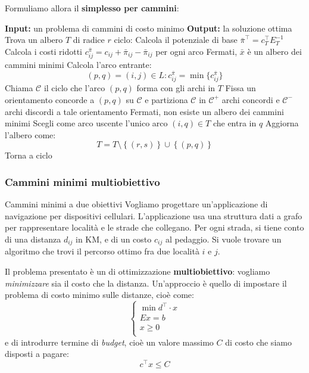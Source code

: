 \documentclass[a4paper,11pt]{article}
\begin{document}
Formuliamo allora il \textbf{simplesso per cammini}:
\begin{algorithm}[H]
\caption{del simplesso per cammini}
\begin{algorithmic}
	\STATE \textbf{Input:} un problema di cammini di costo minimo 
	\STATE \textbf{Output:} la soluzione ottima 
	\STATE Trova un albero $T$ di radice $r$ 
	\STATE \textsf{ciclo:}
	\STATE Calcola il potenziale di base $\bar{\pi}^\intercal = c_T^\intercal E_T^{-1}$
	\STATE Calcola i costi ridotti $c_{ij}^{\bar{\pi}} = c_{ij} + \bar{\pi}_{ij} - \bar{\pi}_{ij}$ per ogni arco
	\STATE Fermati, $\bar{x}$ è un albero dei cammini minimi 
\ELSE
		\STATE Calcola l'arco entrante: 
		$$
		(p, q) = (i, j) \in L : c_{ij}^{\bar{\pi}} = \min \{ c_{ij}^{\bar{\pi}} \} 
		$$
		\STATE Chiama $\mathcal{C}$ il ciclo che l'arco $(p, q)$ forma con gli archi in $T$
		\STATE Fissa un orientamento concorde a $(p,q)$ su $\mathcal{C}$ e partiziona $\mathcal{C}$ in $\mathcal{C^+}$ archi concordi e $\mathcal{C^-}$ archi discordi a tale orientamento
	\ENDIF
		\STATE Fermati, non esiste un albero dei cammini minimi 
	\ELSE
		\STATE Scegli come arco uscente l'unico arco $(i, q) \in T$ che entra in $q$ 
	\ENDIF
	\STATE Aggiorna l'albero come:
	$$
	T = T \setminus \left\{ (r,s) \right\} \cup \left\{ (p, q) \right\} 
	$$
	\STATE Torna a \textsf{ciclo}
\end{algorithmic}
\end{algorithm}

\subsubsection{Cammini minimi multiobiettivo}
\begin{problem}{Cammini minimi a due obiettivi}
	Vogliamo progettare un'applicazione di navigazione per dispositivi cellulari.
	L'applicazione usa una struttura dati a grafo per rappresentare località e le strade che collegano.
	Per ogni strada, si tiene conto di una distanza $d_{ij}$ in KM, e di un costo $c_{ij}$ al pedaggio.
	Si vuole trovare un algoritmo che trovi il percorso ottimo fra due località $i$ e $j$.
\end{problem}

Il problema presentato è un di ottimizzazione \textbf{multiobiettivo}: vogliamo \textit{minimizzare} sia il costo che la distanza.
Un'approccio è quello di impostare il problema di costo minimo sulle distanze, cioè come:
\[
	\begin{cases}
		\min d^\intercal \cdot x \\ 
		Ex = b \\ 
		x \geq 0 \\ 
	\end{cases}
\]
e di introdurre termine di \textit{budget}, cioè un valore massimo $C$ di costo che siamo disposti a pagare:
$$
c^\intercal x \leq C
$$
\end{document}
